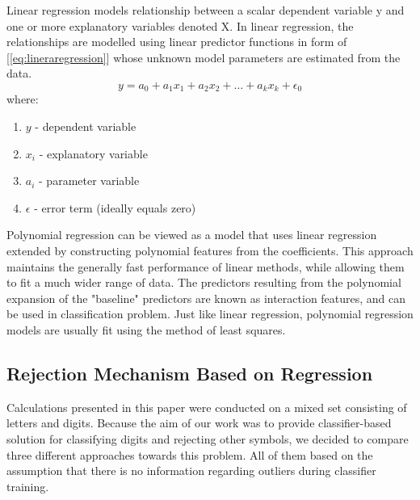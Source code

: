 \documentclass{llncs}
\begin{document}
Linear regression models relationship between a scalar dependent variable y and one or more explanatory variables denoted X. In linear regression, the relationships are modelled using linear predictor functions in form of [\ref{eq:lineraregression}] whose unknown model parameters are estimated from the data.
\begin{equation} \label{eq:lineraregression} y = a_{0} + a_{1}x_{1} + a_{2}x_{2} + \dots + a_{k}x_{k} + \epsilon_{0} \end{equation} where:
\begin{enumerate}
	\item $y$ - dependent variable \\
	\item $x_{i}$ - explanatory variable \\
	\item $a_{i}$ - parameter variable \\
	\item $\epsilon$ - error term (ideally equals zero) \\
\end{enumerate}

Polynomial regression can be viewed as a model that uses linear regression extended by constructing polynomial features from the coefficients. This approach maintains the generally fast performance of linear methods, while allowing them to fit a much wider range of data. The predictors resulting from the polynomial expansion of the "baseline" predictors are known as interaction features, and can be used in classification problem. Just like linear regression, polynomial regression models are usually fit using the method of least squares. \\





\subsection{Rejection Mechanism Based on Regression}
Calculations presented in this paper were conducted on a mixed set consisting of letters and digits. Because the aim of our work was to provide classifier-based solution for classifying digits and rejecting other symbols, we decided to compare three different approaches towards this problem. All of them based on the assumption that there is no information regarding outliers during classifier training. \\
\end{document}
